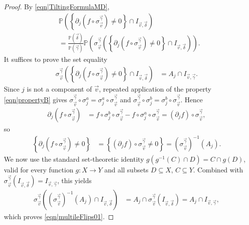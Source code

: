 \documentclass[10pt,a4paper]{amsart}
\begin{document}
\begin{proof} 
By \eqref{eqn|TiltingFormulaMD},
\begin{align*}
&\mathbb P\left(\left\{\partial_j \left(f\circ \sigma_{\overrightarrow v}^{\overrightarrow\gamma}\right)\neq0\right\} \cap I_{\overrightarrow v,\overrightarrow\delta}\right)
\\ &=
\frac{\mathbb P(\overrightarrow\delta)}{\mathbb P(\overrightarrow\gamma)}\mathbb P\left(\sigma_{\overrightarrow v}^{\overrightarrow \gamma}\left(\left\{\partial_j \left(f\circ \sigma_{\overrightarrow v}^{\overrightarrow\gamma}\right)\neq0\right\} \cap I_{\overrightarrow v,\overrightarrow\delta}
\right)
\right).
\end{align*}
It suffices to prove the set equality
\begin{align}
\sigma_{\overrightarrow v}^{\overrightarrow \gamma}\left(\left\{\partial_j \left(f\circ \sigma_{\overrightarrow v}^{\overrightarrow\gamma}\right)\neq0\right\} \cap I_{\overrightarrow v,\overrightarrow\delta}
\right)
&= 
A_j\cap I_{\overrightarrow v,\overrightarrow\gamma}. \label{eqn|multileFlips01}
\end{align}
Since $j$ is not a component of $\overrightarrow v$, repeated application of the property \eqref{eqn|propertyB} gives 
$\sigma_{\overrightarrow v}^{\overrightarrow \gamma}\circ \sigma_j^a=\sigma_j^a\circ \sigma_{\overrightarrow v}^{\overrightarrow \gamma}$ and 
$\sigma_{\overrightarrow v}^{\overrightarrow \gamma}\circ \sigma_j^b=\sigma_j^b\circ \sigma_{\overrightarrow v}^{\overrightarrow \gamma}$. Hence
\begin{align*}
\partial_j 
\left(f\circ \sigma_{\overrightarrow v}^{\overrightarrow\gamma}\right)
&=
f\circ\sigma_j^b\circ\sigma_{\overrightarrow v}^{\overrightarrow\gamma}-f\circ\sigma_j^a\circ\sigma_{\overrightarrow v}^{\overrightarrow\gamma}
=
(\partial_j f)\circ \sigma_{\overrightarrow v}^{\overrightarrow\gamma},
\end{align*}
so
\begin{align*}
\left\{\partial_j \left(f\circ \sigma_{\overrightarrow v}^{\overrightarrow\gamma}\right)\neq 0\right\}
&=
\left\{(\partial_j f)\circ \sigma_{\overrightarrow v}^{\overrightarrow\gamma}\neq 0\right\}
=
\left(\sigma_{\overrightarrow v}^{\overrightarrow\gamma}\right)^{-1}(A_j).
\end{align*}
We now use the standard set-theoretic identity 
$g\!\left(g^{-1}(C)\cap D\right)=C\cap g(D)$, valid for every function 
$g:X\to Y$ and all subsets $D\subseteq X$, $C\subseteq Y$. Combined 
with $\sigma_{\overrightarrow v}^{\overrightarrow \gamma}
\!\left(I_{\overrightarrow v,\overrightarrow\delta}\right)
=I_{\overrightarrow v,\overrightarrow\gamma}$, this yields
\begin{align*}
\sigma_{\overrightarrow v}^{\overrightarrow \gamma}\!\left(
\left(\sigma_{\overrightarrow v}^{\overrightarrow\gamma}\right)^{-1}\!(A_j)
\cap I_{\overrightarrow v,\overrightarrow\delta}\right)
&=
A_j\cap \sigma_{\overrightarrow v}^{\overrightarrow \gamma}\!\left(
I_{\overrightarrow v,\overrightarrow\delta}\right)
=
A_j\cap I_{\overrightarrow v,\overrightarrow\gamma},
\end{align*}
which proves \eqref{eqn|multileFlips01}.
\end{proof}
\end{document}
